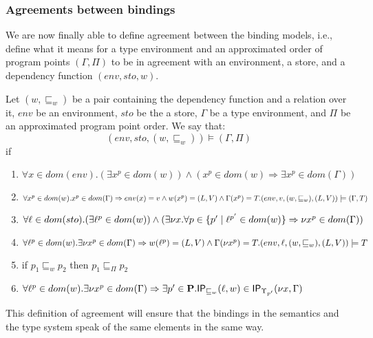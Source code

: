 \documentclass[acmsmall,sigplan]{acmart}
\newcommand{\uf}{\ensuremath{\mathsf{IP}}}
\begin{document}
\subsubsection{Agreements between bindings}

We are now finally able to define agreement between the binding models, i.e.,
define what it means for a type environment and an approximated order
of program points $(\Gamma,\Pi)$ to be in agreement with an
environment, a store, and a dependency function $(env,sto,w)$.

\begin{definition}\label{def:EnvAgree}
	Let $(w,\sqsubseteq_w)$ be a pair containing the dependency function and a relation over it, $env$ be an environment, $sto$ be the a store, $\Gamma$ be a type environment, and $\Pi$ be an approximated program point order.
	We say that:
	$$(env,sto,(w,\sqsubseteq_w))\models(\Gamma,\Pi)$$
	if 
	\begin{enumerate}
		\item \label{prop:1} $\forall x\in dom(env).(\exists x^p\in dom(w))\wedge(x^p\in dom(w)\Rightarrow \exists x^p\in dom(\Gamma))$
		\item \label{prop:2} $\forall x^p\in dom(w).x^p\in dom(\Gamma)\Rightarrow env(x)=v\wedge w(x^p)=(L,V)\wedge\Gamma(x^p)=T.\\(env,v,(w,\sqsubseteq_w),(L,V))\models (\Gamma,T)$
		\item \label{prop:3} $\forall \ell\in dom(sto).(\exists \ell^p\in dom(w))\wedge(\exists \nu x.\forall p\in\{p'\mid\ell^{p'}\in dom(w)\}\Rightarrow\nu x^p\in dom(\Gamma))$
		\item \label{prop:4} $\forall \ell^p \in dom(w).\exists\nu x^{p}\in dom(\Gamma)\Rightarrow w(\ell^p)=(L,V)\wedge\Gamma(\nu x^{p})=T.(env,\ell,(w,\sqsubseteq_w),(L,V))\models T$
		\item \label{prop:5} if $p_1\sqsubseteq_w p_2$ then $p_1\sqsubseteq_\Pi p_2$
	\item \label{prop:6} $\forall \loc^p\in dom(w).\exists \nu
          x^p\in dom(\Gamma)\Rightarrow\exists
          p'\in\cat{P}.\uf_{\sqsubseteq_w}(\loc,w)\in
          \uf_{\Upsilon_{p'}}(\nu x,\Gamma)$ 
	\end{enumerate}
\end{definition}

This definition of agreement will ensure that the bindings in the
semantics and the type system speak of the same elements in the same way.%
\end{document}
